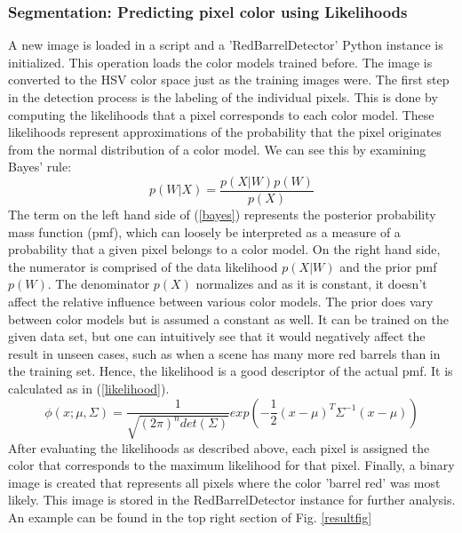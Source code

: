 \documentclass[letterpaper, 10 pt, conference]{ieeeconf}  %
\begin{document}
\subsubsection{Segmentation: Predicting pixel color using Likelihoods}
A new image is loaded in a script and a 'RedBarrelDetector' Python instance is initialized. This operation loads the color models trained before. The image is converted to the HSV color space just as the training images were. The first step in the detection process is the labeling of the individual pixels. This is done by computing the likelihoods that a pixel corresponds to each color model. These likelihoods represent approximations of the probability that the pixel originates from the normal distribution of a color model. We can see this by examining Bayes' rule:
\begin{equation} \label{bayes}
p(W|X) = \frac{p(X|W)p(W)}{p(X)}
\end{equation}
The term on the left hand side of (\ref{bayes}) represents the posterior probability mass function (pmf), which can loosely be interpreted as a measure of a probability that a given pixel belongs to a color model. On the right hand side, the numerator is comprised of the data likelihood $p(X|W)$ and the prior pmf $p(W)$. The denominator $p(X)$ normalizes and as it is constant, it doesn't affect the relative influence between various color models. The prior does vary between color models but is assumed a constant as well. It can be trained on the given data set, but one can intuitively see that it would negatively affect the result in unseen cases, such as when a scene has many more red barrels than in the training set. Hence, the likelihood is a good descriptor of the actual pmf. It is calculated as in (\ref{likelihood}).
\begin{equation} \label{likelihood}
\phi(x;\mu,\Sigma) = \frac{1}{\sqrt{(2\pi)^n det(\Sigma)}} exp \left(-\frac{1}{2}(x-\mu)^T \Sigma^{-1}(x-\mu)\right)
\end{equation}
After evaluating the likelihoods as described above, each pixel is assigned the color that corresponds to the maximum likelihood for that pixel. Finally, a binary image is created that represents all pixels where the color 'barrel red' was most likely. This image is stored in the RedBarrelDetector instance for further analysis. An example can be found in the top right section of Fig. \ref{resultfig}
\end{document}
